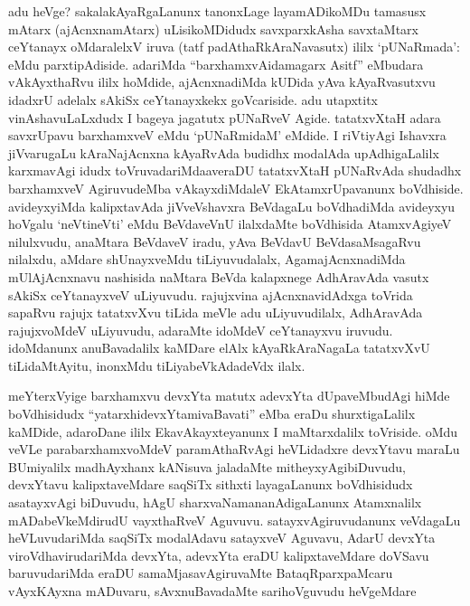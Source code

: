 
\begin{artha}
adu heVge? sakalakAyaRgaLanunx tanonxLage layamADikoMDu tamasusx mAtarx (ajAcnxnamAtarx) uLisikoMDidudx savxparxkAsha savxtaMtarx ceYtanayx oMdaralelxV  iruva (tatf padAthaRkAraNavasutx) ililx `pUNaRmada': eMdu parxtipAdiside. adariMda ``barxhamxvAidamagarx Asitf'' eMbudara vAkAyxthaRvu ililx hoMdide, ajAcnxnadiMda kUDida yAva kAyaRvasutxvu idadxrU adelalx sAkiSx ceYtanayxkekx goVcariside. adu utapxtitx vinAshavuLaLxdudx I bageya jagatutx pUNaRveV Agide. tatatxvXtaH adara savxrUpavu barxhamxveV eMdu `pUNaRmidaM' eMdide. I riVtiyAgi Ishavxra jiVvarugaLu kAraNajAcnxna kAyaRvAda budidhx modalAda upAdhigaLalilx karxmavAgi idudx toVruvadariMda\break averaDU tatatxvXtaH pUNaRvAda shudadhx barxhamxveV AgiruvudeMba vAkayxdiMdaleV EkAtamxrUpavanunx boVdhiside. avideyxyiMda kalipxtavAda jiVveVshavxra BeVdagaLu boVdhadiMda avideyxyu hoVgalu `neVtineVti' eMdu BeVdaveVnU ilalxdaMte boVdhisida AtamxvAgiyeV nilulxvudu, anaMtara BeVdaveV iradu, yAva BeVdavU BeVdasaMsagaRvu nilalxdu, aMdare shUnayxveMdu tiLiyuvudalalx, AgamajAcnxnadiMda mUlAjAcnxnavu nashisida naMtara BeVda kalapxnege AdhAravAda vasutx sAkiSx ceYtanayxveV uLiyuvudu. rajujxvina ajAcnxnavidAdxga toVrida sapaRvu rajujx tatatxvXvu tiLida meVle adu uLiyuvudilalx, AdhAravAda rajujxvoMdeV uLiyuvudu, adaraMte idoMdeV ceYtanayxvu iruvudu. idoMdanunx anuBavadalilx kaMDare elAlx kAyaRkAraNagaLa tatatxvXvU tiLidaMtAyitu, inonxMdu tiLiyabeVkAdadeVdx ilalx. 
\end{artha}


\begin{artha}
meYterxVyige barxhamxvu devxYta matutx adevxYta dUpaveMbudAgi hiMde boVdhisidudx ``yatarxhidevxYtamivaBavati'' eMba eraDu shurxtigaLalilx kaMDide, adaroDane ililx EkavAkayxteyanunx I maMtarxdalilx toVriside. oMdu veVLe parabarxhamxvoMdeV paramAthaRvAgi heVLidadxre devxYtavu maraLu BUmiyalilx madhAyxhanx kANisuva jaladaMte mitheyxyAgibiDuvudu, devxYtavu kalipxtaveMdare saqSiTx sithxti layagaLanunx boVdhisidudx asatayxvAgi biDuvudu, hAgU sharxvaNamananAdigaLanunx Atamxnalilx mADabeVkeMdirudU vayxthaRveV Aguvuvu. satayxvAgiruvudanunx veVdagaLu heVLuvudariMda saqSiTx modalAdavu satayxveV Aguvavu, AdarU devxYta viroVdhavirudariMda devxYta, adevxYta eraDU kalipxtaveMdare doVSavu baruvudariMda eraDU samaMjasavAgiruvaMte BataqRparxpaMcaru vAyxKAyxna mADuvaru, sAvxnuBavadaMte sarihoVguvudu heVgeMdare\ndash 
\end{artha}

